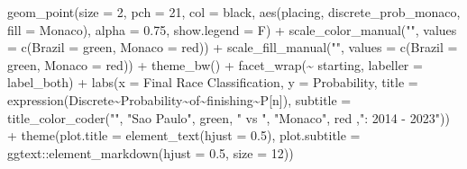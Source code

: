\documentclass[
]{book}
\newenvironment{Shaded}{\begin{snugshade}}{\end{snugshade}}
\newcommand{\AttributeTok}[1]{\textcolor[rgb]{0.77,0.63,0.00}{#1}}
\newcommand{\DecValTok}[1]{\textcolor[rgb]{0.00,0.00,0.81}{#1}}
\newcommand{\FloatTok}[1]{\textcolor[rgb]{0.00,0.00,0.81}{#1}}
\newcommand{\FunctionTok}[1]{\textcolor[rgb]{0.00,0.00,0.00}{#1}}
\newcommand{\NormalTok}[1]{#1}
\newcommand{\OtherTok}[1]{\textcolor[rgb]{0.56,0.35,0.01}{#1}}
\newcommand{\SpecialCharTok}[1]{\textcolor[rgb]{0.00,0.00,0.00}{#1}}
\newcommand{\StringTok}[1]{\textcolor[rgb]{0.31,0.60,0.02}{#1}}
\begin{document}
\begin{Shaded}
\begin{Highlighting}[]
  \FunctionTok{geom\_point}\NormalTok{(}\AttributeTok{size =} \DecValTok{2}\NormalTok{, }\AttributeTok{pch =} \DecValTok{21}\NormalTok{, }\AttributeTok{col =} \StringTok{\textquotesingle{}black\textquotesingle{}}\NormalTok{, }\FunctionTok{aes}\NormalTok{(placing, discrete\_prob\_monaco, }\AttributeTok{fill =} \StringTok{\textquotesingle{}Monaco\textquotesingle{}}\NormalTok{), }\AttributeTok{alpha =} \FloatTok{0.75}\NormalTok{, }\AttributeTok{show.legend =}\NormalTok{ F) }\SpecialCharTok{+}
  \FunctionTok{scale\_color\_manual}\NormalTok{(}\StringTok{""}\NormalTok{, }\AttributeTok{values =} \FunctionTok{c}\NormalTok{(}\StringTok{\textquotesingle{}Brazil\textquotesingle{}} \OtherTok{=} \StringTok{\textquotesingle{}green\textquotesingle{}}\NormalTok{, }\StringTok{\textquotesingle{}Monaco\textquotesingle{}} \OtherTok{=} \StringTok{\textquotesingle{}red\textquotesingle{}}\NormalTok{)) }\SpecialCharTok{+}
  \FunctionTok{scale\_fill\_manual}\NormalTok{(}\StringTok{""}\NormalTok{, }\AttributeTok{values =} \FunctionTok{c}\NormalTok{(}\StringTok{\textquotesingle{}Brazil\textquotesingle{}} \OtherTok{=} \StringTok{\textquotesingle{}green\textquotesingle{}}\NormalTok{, }\StringTok{\textquotesingle{}Monaco\textquotesingle{}} \OtherTok{=} \StringTok{\textquotesingle{}red\textquotesingle{}}\NormalTok{)) }\SpecialCharTok{+}
  \FunctionTok{theme\_bw}\NormalTok{() }\SpecialCharTok{+}
  \FunctionTok{facet\_wrap}\NormalTok{(}\SpecialCharTok{\textasciitilde{}}\NormalTok{ starting, }\AttributeTok{labeller =}\NormalTok{ label\_both) }\SpecialCharTok{+}
  \FunctionTok{labs}\NormalTok{(}\AttributeTok{x =} \StringTok{\textquotesingle{}Final Race Classification\textquotesingle{}}\NormalTok{,}
       \AttributeTok{y =} \StringTok{\textquotesingle{}Probability\textquotesingle{}}\NormalTok{,}
       \AttributeTok{title =} \FunctionTok{expression}\NormalTok{(Discrete}\SpecialCharTok{\textasciitilde{}}\NormalTok{Probability}\SpecialCharTok{\textasciitilde{}}\NormalTok{of}\SpecialCharTok{\textasciitilde{}}\NormalTok{finishing}\SpecialCharTok{\textasciitilde{}}\NormalTok{P[n]),}
       \AttributeTok{subtitle =} \FunctionTok{title\_color\_coder}\NormalTok{(}\StringTok{""}\NormalTok{, }\StringTok{"Sao Paulo"}\NormalTok{, }\StringTok{\textquotesingle{}green\textquotesingle{}}\NormalTok{, }\StringTok{" vs "}\NormalTok{, }\StringTok{"Monaco"}\NormalTok{, }\StringTok{\textquotesingle{}red\textquotesingle{}}\NormalTok{ ,}\StringTok{": 2014 {-} 2023"}\NormalTok{)) }\SpecialCharTok{+}
  \FunctionTok{theme}\NormalTok{(}\AttributeTok{plot.title =} \FunctionTok{element\_text}\NormalTok{(}\AttributeTok{hjust =} \FloatTok{0.5}\NormalTok{),}
        \AttributeTok{plot.subtitle =}\NormalTok{ ggtext}\SpecialCharTok{::}\FunctionTok{element\_markdown}\NormalTok{(}\AttributeTok{hjust =} \FloatTok{0.5}\NormalTok{, }\AttributeTok{size =} \DecValTok{12}\NormalTok{)) }
\end{Highlighting}
\end{Shaded}
\end{document}
